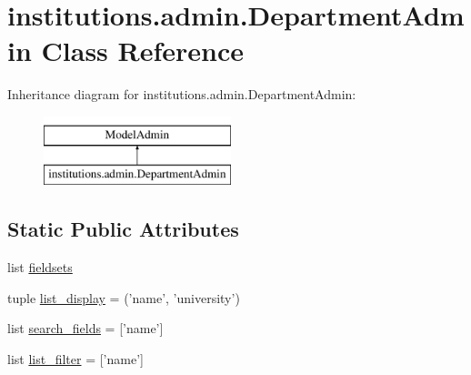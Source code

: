 \hypertarget{classinstitutions_1_1admin_1_1_department_admin}{\section{institutions.\-admin.\-Department\-Admin Class Reference}
\label{classinstitutions_1_1admin_1_1_department_admin}
}
Inheritance diagram for institutions.\-admin.\-Department\-Admin\-:\begin{figure}[H]
\begin{center}
\leavevmode
\includegraphics[height=2.000000cm]{classinstitutions_1_1admin_1_1_department_admin}
\end{center}
\end{figure}
\subsection*{Static Public Attributes}
\begin{DoxyCompactItemize}
\item 
list \hyperlink{classinstitutions_1_1admin_1_1_department_admin_a1d6b1412fe76305e156453dd0b6cffc6}{fieldsets}
\item 
tuple \hyperlink{classinstitutions_1_1admin_1_1_department_admin_aabdec6672d05ba88874cb9b1b371cb78}{list\-\_\-display} = ('name', 'university')
\item 
list \hyperlink{classinstitutions_1_1admin_1_1_department_admin_aea0751d1d5399292d91445e2a5339e98}{search\-\_\-fields} = \mbox{[}'name'\mbox{]}
\item 
list \hyperlink{classinstitutions_1_1admin_1_1_department_admin_a6acc9d177a0a2f8da5240f83428dfc73}{list\-\_\-filter} = \mbox{[}'name'\mbox{]}
\end{DoxyCompactItemize}


